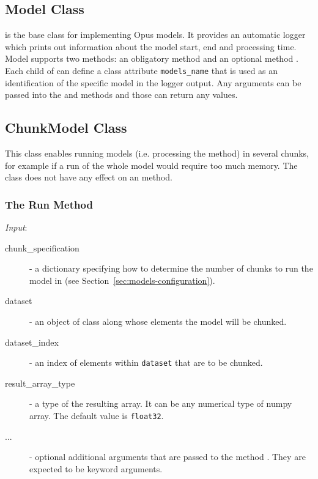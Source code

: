 {\subsection{Model Class}
 is the base class for implementing Opus models. It provides an
automatic logger which prints out information about the model start, end and
processing time.  Model supports two methods: an obligatory method
 and an optional method . Each child of
 can define a class attribute \attributesindex \verb|models_name| that is used as
an identification of the specific model in the logger output. Any arguments
can be passed into the  and  methods and
those can return any values.

\subsection{ChunkModel Class}
\label{sec:chunk-model} 

This class enables running models (i.e. processing the  method) in
several chunks, for example if a run of the whole model would require too much
memory. The class does not have any effect on an  method.

\subsubsection{The Run Method}
{\it Input}:
\begin{description}
\item[chunk_specification] - a dictionary specifying how to determine the number
  of chunks to run the model in (see Section~\ref{sec:models-configuration}).
\item[dataset] - an object of class  along whose elements the
  model will be chunked.
\item[dataset_index] - an index of elements within \verb|dataset| that are to
  be chunked.
\item[result_array_type] - a type of the resulting array. It can be any numerical type of numpy array. \numpyindex
        The default value is \verb|float32|.
\item[...] - optional additional arguments that are passed to the method
  . They are expected to be keyword arguments.
\end{description}


}
